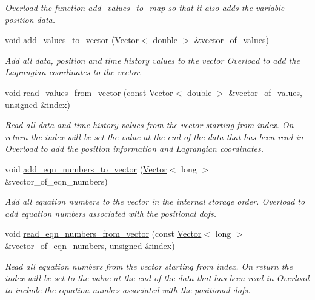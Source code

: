 \begin{DoxyCompactItemize}
\begin{DoxyCompactList}\small\item\em Overload the function add\+\_\+values\+\_\+to\+\_\+map so that it also adds the variable position data. \end{DoxyCompactList}\item 
void \hyperlink{classoomph_1_1SolidNode_a20562ea5133c1150b6999a73badb63e8}{add\+\_\+values\+\_\+to\+\_\+vector} (\hyperlink{classoomph_1_1Vector}{Vector}$<$ double $>$ \&vector\+\_\+of\+\_\+values)
\begin{DoxyCompactList}\small\item\em Add all data, position and time history values to the vector Overload to add the Lagrangian coordinates to the vector. \end{DoxyCompactList}\item 
void \hyperlink{classoomph_1_1SolidNode_a8884dfe9e2808883e90c7f2822151784}{read\+\_\+values\+\_\+from\+\_\+vector} (const \hyperlink{classoomph_1_1Vector}{Vector}$<$ double $>$ \&vector\+\_\+of\+\_\+values, unsigned \&index)
\begin{DoxyCompactList}\small\item\em Read all data and time history values from the vector starting from index. On return the index will be set the value at the end of the data that has been read in Overload to add the position information and Lagrangian coordinates. \end{DoxyCompactList}\item 
void \hyperlink{classoomph_1_1SolidNode_ad875a778d7d3bc32a847d93f6698bce4}{add\+\_\+eqn\+\_\+numbers\+\_\+to\+\_\+vector} (\hyperlink{classoomph_1_1Vector}{Vector}$<$ long $>$ \&vector\+\_\+of\+\_\+eqn\+\_\+numbers)
\begin{DoxyCompactList}\small\item\em Add all equation numbers to the vector in the internal storage order. Overload to add equation numbers associated with the positional dofs. \end{DoxyCompactList}\item 
void \hyperlink{classoomph_1_1SolidNode_a38bede9e51c7d6355969db2bc075f476}{read\+\_\+eqn\+\_\+numbers\+\_\+from\+\_\+vector} (const \hyperlink{classoomph_1_1Vector}{Vector}$<$ long $>$ \&vector\+\_\+of\+\_\+eqn\+\_\+numbers, unsigned \&index)
\begin{DoxyCompactList}\small\item\em Read all equation numbers from the vector starting from index. On return the index will be set to the value at the end of the data that has been read in Overload to include the equation numbrs associated with the positional dofs. \end{DoxyCompactList}\item 

\end{DoxyCompactItemize}
